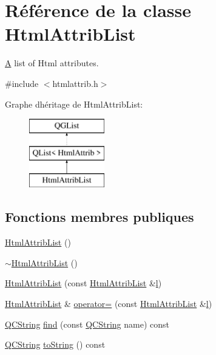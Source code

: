 \hypertarget{class_html_attrib_list}{}\section{Référence de la classe Html\+Attrib\+List}
\label{class_html_attrib_list}


\hyperlink{class_a}{A} list of Html attributes.  




{\ttfamily \#include $<$htmlattrib.\+h$>$}

Graphe d\textquotesingle{}héritage de Html\+Attrib\+List\+:\begin{figure}[H]
\begin{center}
\leavevmode
\includegraphics[height=3.000000cm]{class_html_attrib_list}
\end{center}
\end{figure}
\subsection*{Fonctions membres publiques}
\begin{DoxyCompactItemize}
\item 
\hyperlink{class_html_attrib_list_a649260aba1f62e4078f20c9992df040d}{Html\+Attrib\+List} ()
\item 
\hyperlink{class_html_attrib_list_a965cdd6b374f8310c63d68e745f48f34}{$\sim$\+Html\+Attrib\+List} ()
\item 
\hyperlink{class_html_attrib_list_a00e723777ae8d075de72272720914f5f}{Html\+Attrib\+List} (const \hyperlink{class_html_attrib_list}{Html\+Attrib\+List} \&\hyperlink{060__command__switch_8tcl_aff56f84b49947b84b2a304f51cf8e678}{l})
\item 
\hyperlink{class_html_attrib_list}{Html\+Attrib\+List} \& \hyperlink{class_html_attrib_list_a7120c5321790b23f71c77ca2a71110a1}{operator=} (const \hyperlink{class_html_attrib_list}{Html\+Attrib\+List} \&\hyperlink{060__command__switch_8tcl_aff56f84b49947b84b2a304f51cf8e678}{l})
\item 
\hyperlink{class_q_c_string}{Q\+C\+String} \hyperlink{class_html_attrib_list_a6961f41b51cd039dd8f6942f7096ea23}{find} (const \hyperlink{class_q_c_string}{Q\+C\+String} name) const 
\item 
\hyperlink{class_q_c_string}{Q\+C\+String} \hyperlink{class_html_attrib_list_a89e51dba768ec81e07e2fcc0e2c07eeb}{to\+String} () const 
\end{DoxyCompactItemize}


